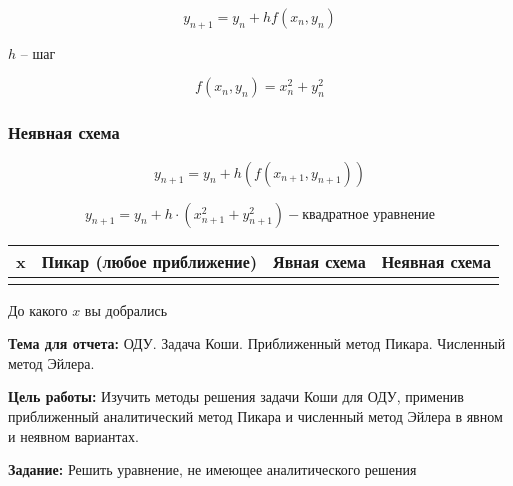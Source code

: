 \begin{equation*}
    y_{n+1} = y_n + h f(x_n, y_n)
\end{equation*}

$h$ -- шаг

\begin{equation*}
    f(x_n, y_n) = x_n^2 + y_n^2
\end{equation*}

\subsubsection{Неявная схема}

\begin{equation*}
    y_{n+1} = y_n + h (f(x_{n+1}, y_{n+1}))
\end{equation*}

\begin{equation*}
    y_{n+1} = y_n + h \cdot (x^2_{n+1} + y^2_{n+1}) -
    \text{квадратное уравнение}
\end{equation*}

\begin{table}[H]
    \centering
    \begin{tabular}{|c|c|c|c|}
        \hline
        x & Пикар (любое приближение) & Явная схема & Неявная схема \\
        \hline
          & & & \\
    \end{tabular}
\end{table}

До какого $x$ вы добрались

\textbf{Тема для отчета:}
ОДУ. Задача Коши. Приближенный метод Пикара. Численный метод Эйлера.

\textbf{Цель работы:}
Изучить методы решения задачи Коши для ОДУ, применив
приближенный аналитический метод Пикара и численный метод Эйлера
в явном и неявном вариантах.

\textbf{Задание:}
Решить уравнение, не имеющее аналитического решения
